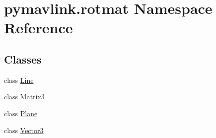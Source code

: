 \hypertarget{namespacepymavlink_1_1rotmat}{}\section{pymavlink.\+rotmat Namespace Reference}
\label{namespacepymavlink_1_1rotmat}
\subsection*{Classes}
\begin{DoxyCompactItemize}
\item 
class \mbox{\hyperlink{classpymavlink_1_1rotmat_1_1Line}{Line}}
\item 
class \mbox{\hyperlink{classpymavlink_1_1rotmat_1_1Matrix3}{Matrix3}}
\item 
class \mbox{\hyperlink{classpymavlink_1_1rotmat_1_1Plane}{Plane}}
\item 
class \mbox{\hyperlink{classpymavlink_1_1rotmat_1_1Vector3}{Vector3}}
\end{DoxyCompactItemize}
